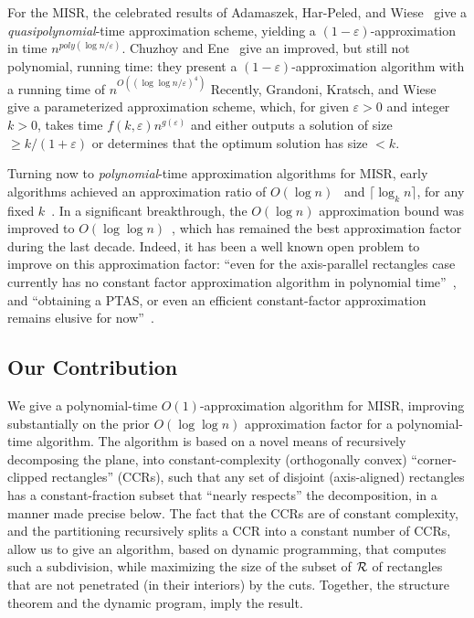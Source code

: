 \documentclass{article}
\newcommand{\eps}{\varepsilon}
\begin{document}
For the MISR, the celebrated results of Adamaszek, Har-Peled, and
Wiese~\cite{adamaszek2019approximation,adamaszek2013approximation,adamaszek2014qptas,har2014quasi}
give a {\em quasipolynomial}-time approximation scheme, yielding a
$(1-\eps)$-approximation in time $n^{poly(\log n/\eps)}$.
Chuzhoy and Ene~\cite{chuzhoy2016approximating} give an improved, but
still not polynomial, running time: they present a
$(1-\eps)$-approximation algorithm with a running time of
$n^{O((\log\log n/\eps)^4)}$
%
%
Recently, Grandoni, Kratsch, and
Wiese~\cite{grandoni2019parameterized} give a parameterized
approximation scheme, which, for given $\eps>0$ and integer $k>0$,
takes time $f(k,\eps)n^{g(\eps)}$ and either outputs a solution of
size $\geq k/(1+\eps)$ or determines that the optimum solution has
size $<k$.

Turning now to {\em polynomial}-time approximation algorithms for
MISR, early algorithms achieved an approximation ratio of $O(\log
n)$~\cite{agarwal1998label,khanna1998approximating,nielsen2000fast} and $\lceil \log_k n\rceil$, for any
fixed $k$~\cite{berman2001improved}.  In a significant breakthrough, the $O(\log
n)$ approximation bound was improved to $O(\log\log
n)$~\cite{chalermsook2009maximum,Chalermsook-APPROX11}, which has
remained the best approximation factor during the last decade.
Indeed, it has been a well known open problem to improve on this
approximation factor: ``even for the axis-parallel rectangles case
currently has no constant factor approximation algorithm in polynomial
time''~\cite{adamaszek2019approximation}, and ``obtaining a PTAS, or
even an efficient constant-factor approximation remains elusive for
now''~\cite{chuzhoy2016approximating}.


\subsection*{Our Contribution}

We give a polynomial-time $O(1)$-approximation algorithm for MISR,
improving substantially on the prior $O(\log\log n)$ approximation
factor for a polynomial-time algorithm. The algorithm is based on a
novel means of recursively decomposing the plane, into
constant-complexity (orthogonally convex) ``corner-clipped
rectangles'' (CCRs), such that any set of disjoint (axis-aligned)
rectangles has a constant-fraction subset that ``nearly respects'' the
decomposition, in a manner made precise below.
%
%
The fact that the CCRs are of constant complexity, and the
partitioning recursively splits a CCR into a constant number of CCRs,
allow us to give an algorithm, based on dynamic programming, that
computes such a subdivision, while maximizing the size of the subset
of ${\cal R}$ of rectangles that are not penetrated (in their
interiors) by the cuts. Together, the structure theorem and the
dynamic program, imply the result.
\end{document}
